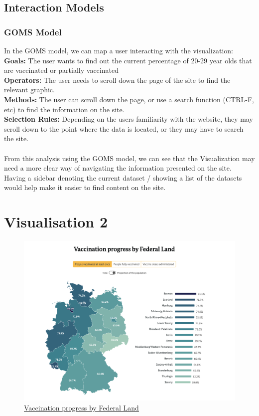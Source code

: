 \documentclass[12pt, letterpaper]{article}
\begin{document}
\subsection{Interaction Models}
\subsubsection{GOMS Model}
In the GOMS model, we can map a user interacting with the visualization: \\
\textbf{Goals:} The user wants to find out the current percentage of 20-29 year olds that are vaccinated or partially vaccinated \\
\textbf{Operators:} The user needs to scroll down the page of the site to find the relevant graphic. \\
\textbf{Methods:} The user can scroll down the page, or use a search function (CTRL-F, etc) to find the information on the site. \\
\textbf{Selection Rules: } Depending on the users familiarity with the website, they may scroll down to the point where the data is located, or they may have to search the site. \\
\\
From this analysis using the GOMS model, we can see that the Visualization may need a more clear way of navigating the information presented on the site. Having a sidebar denoting the current dataset / showing a list of the datasets would help make it easier to find content on the site.



\newpage

\section{Visualisation 2}
\begin{figure}[h]
    \centering
    \includegraphics[width=410pt]{images/Impfdashboard.png}
    \caption{\href{https://impfdashboard.de/en/}{Vaccination progress by Federal Land}}
    \label{fig:my_label}
\end{figure}
\end{document}
